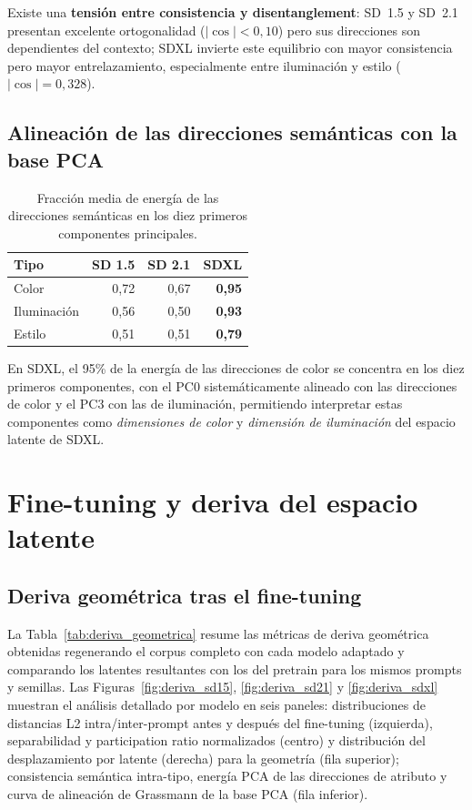 \documentclass[12pt, a4paper, twoside]{book}
\begin{document}
Existe una \textbf{tensión entre consistencia y disentanglement}: SD~1.5 y SD~2.1 presentan excelente ortogonalidad ($|\cos| < 0{,}10$) pero sus direcciones son dependientes del contexto; SDXL invierte este equilibrio con mayor consistencia pero mayor entrelazamiento, especialmente entre iluminación y estilo ($|\cos| = 0{,}328$).

\subsection{Alineación de las direcciones semánticas con la base PCA}

\begin{table}[htb]
\centering
\caption{Fracción media de energía de las direcciones semánticas en los diez primeros componentes principales.}
\label{tab:energia_pca}
\small
\begin{tabular}{lrrr}
\toprule
\textbf{Tipo} & \textbf{SD 1.5} & \textbf{SD 2.1} & \textbf{SDXL} \\
\midrule
Color       & 0,72 & 0,67 & \textbf{0,95} \\
Iluminación & 0,56 & 0,50 & \textbf{0,93} \\
Estilo      & 0,51 & 0,51 & \textbf{0,79} \\
\bottomrule
\end{tabular}
\end{table}

En SDXL, el 95\% de la energía de las direcciones de color se concentra en los diez primeros componentes, con el PC0 sistemáticamente alineado con las direcciones de color y el PC3 con las de iluminación, permitiendo interpretar estas componentes como \textit{dimensiones de color} y \textit{dimensión de iluminación} del espacio latente de SDXL.

\section{Fine-tuning y deriva del espacio latente}
\label{sec:res:finetune}

\subsection{Deriva geométrica tras el fine-tuning}

La Tabla~\ref{tab:deriva_geometrica} resume las métricas de deriva geométrica obtenidas regenerando el corpus completo con cada modelo adaptado y comparando los latentes resultantes con los del pretrain para los mismos prompts y semillas. Las Figuras~\ref{fig:deriva_sd15}, \ref{fig:deriva_sd21} y \ref{fig:deriva_sdxl} muestran el análisis detallado por modelo en seis paneles: distribuciones de distancias L2 intra/inter-prompt antes y después del fine-tuning (izquierda), separabilidad y participation ratio normalizados (centro) y distribución del desplazamiento por latente (derecha) para la geometría (fila superior); consistencia semántica intra-tipo, energía PCA de las direcciones de atributo y curva de alineación de Grassmann de la base PCA (fila inferior).
\end{document}
